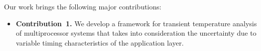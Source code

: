 Our work brings the following major contributions:
\begin{itemize}

  \item {\bfseries Contribution~1.} We develop a framework for transient
    temperature analysis of multiprocessor systems that takes into
    consideration the uncertainty due to variable timing characteristics of the
    application layer.

\end{itemize}
